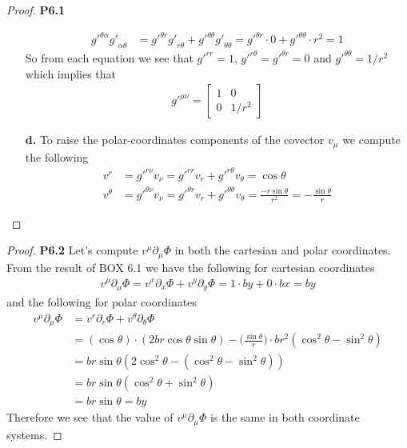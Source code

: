 \documentclass[11pt]{article}
\theoremstyle{definition}
\begin{document}
\begin{proof}{\textbf{P6.1}}
\begin{itemize}
\begin{align*}
            {g'}^{\theta\alpha}{g'}_{\alpha \theta}
            &= {g'}^{\theta r}{g'}_{r\theta} + {g'}^{\theta\theta}{g'}_{\theta\theta}
            = {g'}^{\theta r}\cdot 0 + {g'}^{\theta\theta}\cdot r^2 = 1
        \end{align*}
        So from each equation we see that $g'^{rr} = 1$,
        $g'^{r\theta} = g'^{\theta r} = 0$ and $g'^{\theta\theta} = 1/r^2$
        which implies that
        \begin{align*}
            g'^{\mu\nu} = \begin{bmatrix}
                1 & 0\\
                0 & 1/r^2
            \end{bmatrix}
        \end{align*}
        \item [\textbf{d.}] To raise the polar-coordinates components
        of the covector $v_{\mu}$ we compute the following
        \begin{align*}
            v^r &= g'^{r\nu} v_\nu = g'^{rr}v_r + g'^{r\theta} v_\theta
            = \cos\theta\\
            v^\theta &= g'^{\theta\nu} v_\nu
            = g'^{\theta r}v_r + g'^{\theta\theta} v_\theta
            = \frac{-r\sin\theta}{r^2} = -\frac{\sin\theta}{r}
        \end{align*}
    \end{itemize}
\end{proof}
\cleardoublepage
\begin{proof}{\textbf{P6.2}}
    Let's compute $v^\mu \partial_\mu \Phi$ in both the cartesian and polar
    coordinates. From the result of BOX 6.1 we have the following
    for cartesian coordinates
    \begin{align*}
        v^\mu \partial_\mu \Phi
        = v^x \partial_x \Phi + v^y \partial_y \Phi
        = 1 \cdot by + 0 \cdot bx = by
    \end{align*}
    and the following for polar coordinates
    \begin{align*}
        v^\mu \partial_\mu \Phi
        &= v^r \partial_r \Phi + v^\theta \partial_\theta \Phi\\
        &= (\cos\theta) \cdot (2br\cos\theta\sin\theta) -
        \bigg(\frac{\sin\theta}{r}\bigg) \cdot br^2(\cos^2\theta - \sin^2\theta)\\
        &= br\sin\theta(2\cos^2\theta - (\cos^2\theta - \sin^2\theta))\\
        &= br\sin\theta(\cos^2\theta + \sin^2\theta)\\
        &= br\sin\theta = by
    \end{align*}
    Therefore we see that the value of $v^\mu \partial_\mu \Phi$ is the same
    in both coordinate systems.
\end{proof}
\end{document}
